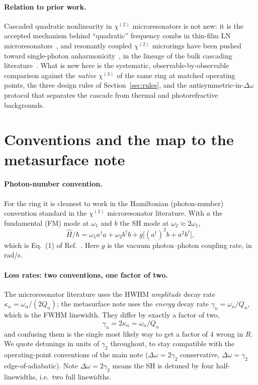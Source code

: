 \documentclass[11pt,a4paper]{article}
\newcommand{\chitwo}{\chi^{(2)}}
\newcommand{\chithree}{\chi^{(3)}}
\newcommand{\Dom}{\Delta\omega}
\begin{document}
\paragraph{Relation to prior work.}  Cascaded quadratic nonlinearity in
$\chitwo$ microresonators is not new: it is the accepted mechanism
behind ``quadratic'' frequency combs in thin-film LN
microresonators~\cite{QuadraticComb2024}, and resonantly coupled
$\chitwo$ microrings have been pushed toward single-photon
anharmonicity~\cite{Lu2020,Lu2019}, in the lineage of the bulk cascading
literature~\cite{DeSalvo1992,Stegeman1996,Khurgin1997}.  What is new here is the
systematic, observable-by-observable comparison against the
\emph{native} $\chithree$ of the same ring at matched operating points,
the three design rules of Section~\ref{sec:rules}, and the
antisymmetric-in-$\Dom$ protocol that separates the cascade from thermal
and photorefractive backgrounds.

\section{Conventions and the map to the metasurface note}\label{sec:conv}

\paragraph{Photon-number convention.}  For the ring it is cleanest to
work in the Hamiltonian (photon-number) convention standard in the
$\chitwo$ microresonator literature.  With $a$ the fundamental (FM) mode
at $\omega_1$ and $b$ the SH mode at $\omega_2\approx2\omega_1$,
\begin{equation}
  \hat H/\hbar=\omega_1 a^\dagger a+\omega_2 b^\dagger b
               +g\bigl[(a^\dagger)^2 b+a^2 b^\dagger\bigr],
  \label{eq:H}
\end{equation}
which is Eq.~(1) of Ref.~\cite{Lu2020}.  Here $g$ is the vacuum
photon--photon coupling rate, in rad/s.

\paragraph{Loss rates: two conventions, one factor of two.}  The
microresonator literature uses the HWHM \emph{amplitude} decay rate
$\kappa_n=\omega_n/(2Q_n)$; the metasurface note uses the \emph{energy}
decay rate $\gamma_n=\omega_n/Q_n$, which is the FWHM linewidth.  They
differ by exactly a factor of two,
\begin{equation}
  \boxed{\;\gamma_n=2\kappa_n=\omega_n/Q_n\;}
\end{equation}
and confusing them is the single most likely way to get a factor of $4$
wrong in $R$.  We quote detunings in units of $\gamma_2$ throughout, to
stay compatible with the operating-point conventions of the main note
($\Dom=2\gamma_2$ conservative, $\Dom=\gamma_2$ edge-of-adiabatic).
Note $\Dom=2\gamma_2$ means the SH is detuned by four half-linewidths,
i.e.\ two full linewidths.
\end{document}
